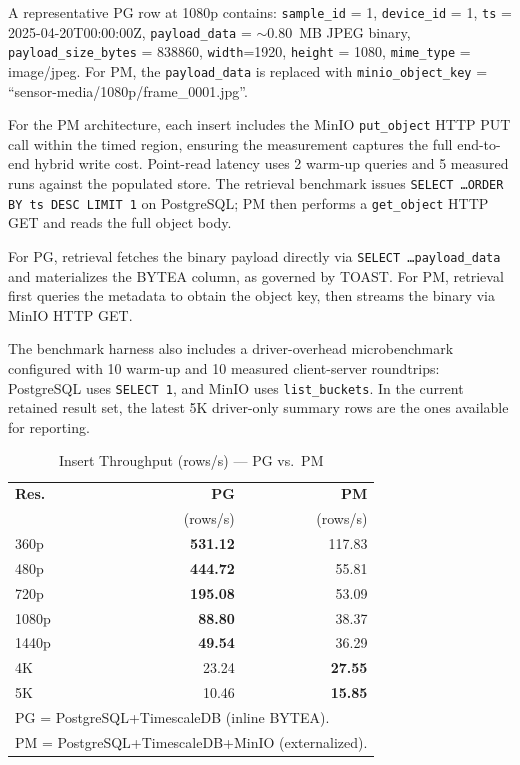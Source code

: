 \documentclass[conference, a4paper]{IEEEtran}
\begin{document}
A representative PG row at 1080p contains: \texttt{sample\_id} = 1, \texttt{device\_id} = 1, \texttt{ts} = 2025-04-20T00:00:00Z, \texttt{payload\_data} = $\sim$0.80~MB JPEG binary, \texttt{payload\_size\_bytes} = 838860, \texttt{width}=1920, \texttt{height} = 1080, \texttt{mime\_type} = image/jpeg. For PM, the \texttt{payload\_data} is replaced with \texttt{minio\_object\_key} = ``sensor-media/1080p/frame\_0001.jpg''.

For the PM architecture, each insert includes the MinIO \texttt{put\_object} HTTP PUT call within the timed region, ensuring the measurement captures the full end-to-end hybrid write cost. Point-read latency uses 2 warm-up queries and 5 measured runs against the populated store. The retrieval benchmark issues \texttt{SELECT \ldots ORDER BY ts DESC LIMIT 1} on PostgreSQL; PM then performs a \texttt{get\_object} HTTP GET and reads the full object body.

For PG, retrieval fetches the binary payload directly via \texttt{SELECT \ldots payload\_data} and materializes the BYTEA column, as governed by TOAST. For PM, retrieval first queries the metadata to obtain the object key, then streams the binary via MinIO HTTP GET.

The benchmark harness also includes a driver-overhead microbenchmark configured with 10 warm-up and 10 measured client-server roundtrips: PostgreSQL uses \texttt{SELECT 1}, and MinIO uses \texttt{list\_buckets}. In the current retained result set, the latest 5K driver-only summary rows are the ones available for reporting.


\begin{table}[htbp]
\centering
\renewcommand{\arraystretch}{1.15}
\caption{Insert Throughput (rows/s) --- PG vs.\ PM}
\label{tab:insert_summary}
\begin{tabular}{l r r}
\hline
\textbf{Res.} & \textbf{PG} & \textbf{PM} \\
 & (rows/s) & (rows/s) \\
\hline
360p  & \textbf{531.12} & 117.83 \\
480p  & \textbf{444.72} & 55.81 \\
720p  & \textbf{195.08} & 53.09 \\
1080p & \textbf{88.80} & 38.37 \\
1440p & \textbf{49.54} & 36.29 \\
4K    & 23.24  & \textbf{27.55} \\
5K    & 10.46  & \textbf{15.85} \\
\hline
\multicolumn{3}{l}{\footnotesize PG = PostgreSQL+TimescaleDB (inline BYTEA).} \\
\multicolumn{3}{l}{\footnotesize PM = PostgreSQL+TimescaleDB+MinIO (externalized).} \\
\end{tabular}
\end{table}
\end{document}
